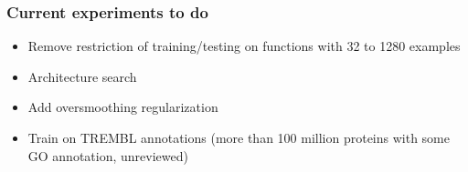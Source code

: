 \documentclass{beamer}
\begin{document}
\begin{frame}
    \frametitle{Current experiments to do}
    \begin{itemize}
        \item Remove restriction of training/testing on functions with 32 to 1280 examples
        \item Architecture search
        \item Add oversmoothing regularization 
        \item Train on TREMBL annotations (more than 100 million proteins with some GO annotation, unreviewed)
    \end{itemize}
\end{frame}


\end{document}
